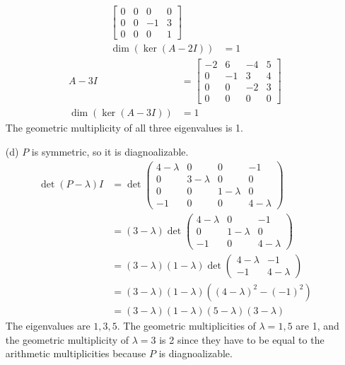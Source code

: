 \documentclass{article}
\begin{document}
\begin{enumerate}
\begin{align*}
\begin{bmatrix}
      0 & 0 & 0 & 0 \\
      0 & 0 & -1 & 3 \\
      0 & 0 & 0 & 1
    \end{bmatrix} \\
    \dim(\ker(A - 2I)) &= 1
  \end{align*}
  \begin{align*}
    A - 3I &=
    \begin{bmatrix}
      -2 & 6 & -4 & 5 \\
      0 & -1 & 3 & 4 \\
      0 & 0 & -2 & 3 \\
      0 & 0 & 0 & 0
    \end{bmatrix} \\
    \dim(\ker(A - 3I)) &= 1
  \end{align*}
  The geometric multiplicity of all three eigenvalues is 1.

  \item[(d)]
  \( P \) is symmetric, so it is diagnoalizable.
  \begin{align*}
    \det(P - \lambda) I &= \det
    \begin{pmatrix}
      4 - \lambda & 0 & 0 & -1 \\
      0 & 3 - \lambda & 0 & 0 \\
      0 & 0 & 1 - \lambda & 0 \\
      -1 & 0 & 0 & 4 - \lambda
    \end{pmatrix} \\
    &= (3 - \lambda) \det
    \begin{pmatrix}
      4 - \lambda & 0 & -1 \\
      0 & 1 - \lambda & 0 \\
      -1 & 0 & 4 - \lambda
    \end{pmatrix} \\
    &= (3 - \lambda)(1 - \lambda) \det
    \begin{pmatrix}
      4 - \lambda & -1 \\
      -1 & 4 - \lambda
    \end{pmatrix} \\
    &= (3 - \lambda)(1 - \lambda)((4 - \lambda)^2 - (-1)^2) \\
    &= (3 - \lambda)(1 - \lambda)(5 - \lambda)(3 - \lambda)
  \end{align*}
  The eigenvalues are \( 1, 3, 5 \). The geometric multiplicities of \( \lambda
  = 1, 5 \) are 1, and the geometric multiplicity of \( \lambda = 3 \) is 2
  since they have to be equal to the arithmetic multiplicities because \( P \)
  is diagnoalizable.


\end{enumerate}
\end{document}
